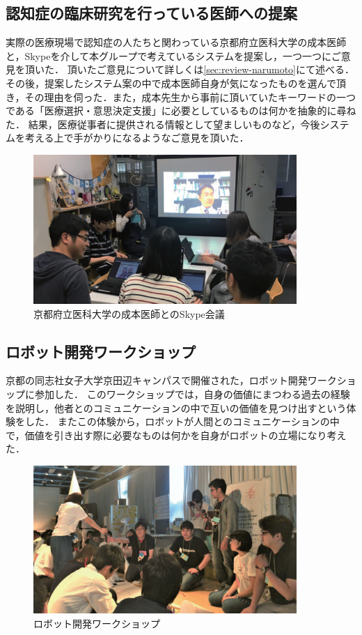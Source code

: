 \documentclass[../report]{subfiles}
\begin{document}
\subsection{認知症の臨床研究を行っている医師への提案}
実際の医療現場で認知症の人たちと関わっている京都府立医科大学の成本医師と，Skypeを介して本グループで考えているシステムを提案し，一つ一つにご意見を頂いた．
頂いたご意見について詳しくは\ref{sec:review-narumoto}にて述べる．
その後，提案したシステム案の中で成本医師自身が気になったものを選んで頂き，その理由を伺った．また，成本先生から事前に頂いていたキーワードの一つである「医療選択・意思決定支援」に必要としているものは何かを抽象的に尋ねた．
結果，医療従事者に提供される情報として望ましいものなど，今後システムを考える上で手がかりになるようなご意見を頂いた．
\begin{figure}[htbp]
    \begin{center}
        \includegraphics[width=10cm]{imgs/ninchisyo-kaigi.png}
        \caption{京都府立医科大学の成本医師とのSkype会議}
        \label{fig:ninchisyo-kaigi}
    \end{center}
\end{figure}

\subsection{ロボット開発ワークショップ}
京都の同志社女子大学京田辺キャンパスで開催された，ロボット開発ワークショップに参加した．
このワークショップでは，自身の価値にまつわる過去の経験を説明し，他者とのコミュニケーションの中で互いの価値を見つけ出すという体験をした．
またこの体験から，ロボットが人間とのコミュニケーションの中で，価値を引き出す際に必要なものは何かを自身がロボットの立場になり考えた．
\begin{figure}[htbp]
    \begin{center}
        \includegraphics[width=10cm]{imgs/ninchisyo-ws.png}
        \caption{ロボット開発ワークショップ}
        \label{fig:ninchisyo-ws}
    \end{center}
\end{figure}
\end{document}
